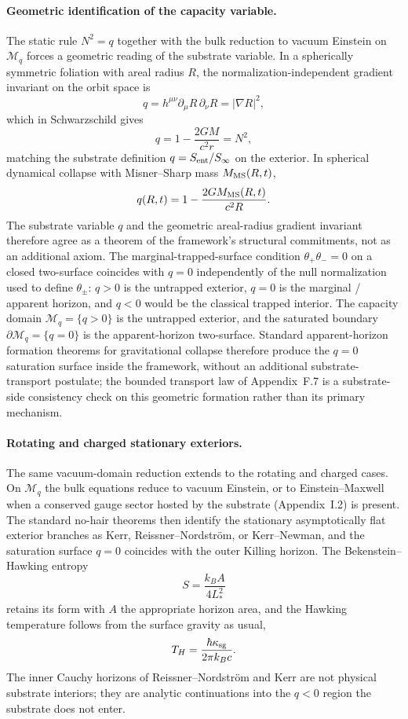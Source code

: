 \documentclass[11pt]{article}
\begin{document}
\paragraph{Geometric identification of the capacity variable.}
The static rule $N^2=q$ together with the bulk reduction to vacuum Einstein on $\mathcal{M}_q$ forces a geometric reading of the substrate variable. In a spherically symmetric foliation with areal radius $R$, the normalization-independent gradient invariant on the orbit space is
\[
q=h^{\mu\nu}\partial_\mu R\,\partial_\nu R=|\nabla R|^2,
\]
which in Schwarzschild gives
\[
q=1-\frac{2GM}{c^2r}=N^2,
\]
matching the substrate definition $q=S_{\rm ent}/S_\infty$ on the exterior. In spherical dynamical collapse with Misner--Sharp mass $M_{\rm MS}(R,t)$,
\[
q(R,t)=1-\frac{2GM_{\rm MS}(R,t)}{c^2R}.
\]
The substrate variable $q$ and the geometric areal-radius gradient invariant therefore agree as a theorem of the framework's structural commitments, not as an additional axiom. The marginal-trapped-surface condition $\theta_+\theta_-=0$ on a closed two-surface coincides with $q=0$ independently of the null normalization used to define $\theta_\pm$: $q>0$ is the untrapped exterior, $q=0$ is the marginal / apparent horizon, and $q<0$ would be the classical trapped interior. The capacity domain $\mathcal{M}_q=\{q>0\}$ is the untrapped exterior, and the saturated boundary $\partial\mathcal{M}_q=\{q=0\}$ is the apparent-horizon two-surface. Standard apparent-horizon formation theorems for gravitational collapse therefore produce the $q=0$ saturation surface inside the framework, without an additional substrate-transport postulate; the bounded transport law of Appendix~F.7 is a substrate-side consistency check on this geometric formation rather than its primary mechanism.

\paragraph{Rotating and charged stationary exteriors.}
The same vacuum-domain reduction extends to the rotating and charged cases. On $\mathcal{M}_q$ the bulk equations reduce to vacuum Einstein, or to Einstein--Maxwell when a conserved gauge sector hosted by the substrate (Appendix~I.2) is present. The standard no-hair theorems then identify the stationary asymptotically flat exterior branches as Kerr, Reissner--Nordstr\"om, or Kerr--Newman, and the saturation surface $q=0$ coincides with the outer Killing horizon. The Bekenstein--Hawking entropy
\[
S=\frac{k_BA}{4L_*^2}
\]
retains its form with $A$ the appropriate horizon area, and the Hawking temperature follows from the surface gravity as usual,
\[
T_H=\frac{\hbar \kappa_{\rm sg}}{2\pi k_Bc}.
\]
The inner Cauchy horizons of Reissner--Nordstr\"om and Kerr are not physical substrate interiors; they are analytic continuations into the $q<0$ region the substrate does not enter.
\end{document}
